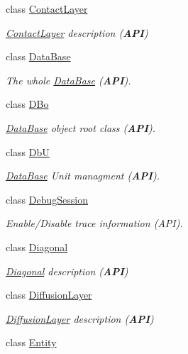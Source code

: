 \begin{DoxyCompactItemize}
class \hyperlink{classHurricane_1_1ContactLayer}{Contact\+Layer}
\begin{DoxyCompactList}\small\item\em \hyperlink{classHurricane_1_1ContactLayer}{Contact\+Layer} description ({\bfseries A\+PI}) \end{DoxyCompactList}\item 
class \hyperlink{classHurricane_1_1DataBase}{Data\+Base}
\begin{DoxyCompactList}\small\item\em The whole \hyperlink{classHurricane_1_1DataBase}{Data\+Base} ({\bfseries A\+PI}). \end{DoxyCompactList}\item 
class \hyperlink{classHurricane_1_1DBo}{D\+Bo}
\begin{DoxyCompactList}\small\item\em \hyperlink{classHurricane_1_1DataBase}{Data\+Base} object root class ({\bfseries A\+PI}). \end{DoxyCompactList}\item 
class \hyperlink{classHurricane_1_1DbU}{DbU}
\begin{DoxyCompactList}\small\item\em \hyperlink{classHurricane_1_1DataBase}{Data\+Base} Unit managment ({\bfseries A\+PI}). \end{DoxyCompactList}\item 
class \hyperlink{classHurricane_1_1DebugSession}{Debug\+Session}
\begin{DoxyCompactList}\small\item\em Enable/\+Disable trace information ({\ttfamily A\+PI}). \end{DoxyCompactList}\item 
class \hyperlink{classHurricane_1_1Diagonal}{Diagonal}
\begin{DoxyCompactList}\small\item\em \hyperlink{classHurricane_1_1Diagonal}{Diagonal} description ({\bfseries A\+PI}) \end{DoxyCompactList}\item 
class \hyperlink{classHurricane_1_1DiffusionLayer}{Diffusion\+Layer}
\begin{DoxyCompactList}\small\item\em \hyperlink{classHurricane_1_1DiffusionLayer}{Diffusion\+Layer} description ({\bfseries A\+PI}) \end{DoxyCompactList}\item 
class \hyperlink{classHurricane_1_1Entity}{Entity}

\end{DoxyCompactItemize}
